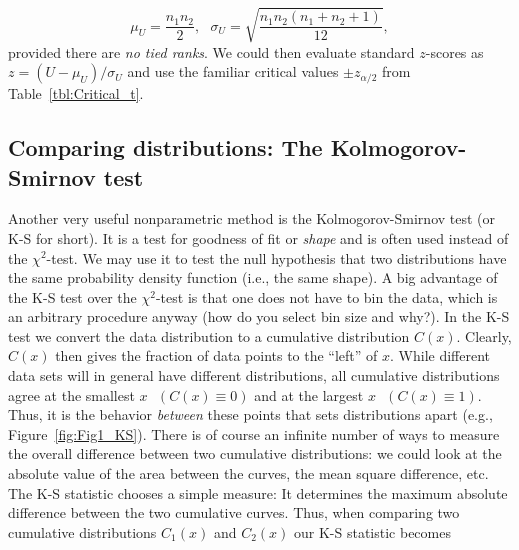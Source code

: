 \begin{equation}
\mu_U = \frac{n_1 n_2}{2}, \ \ \  \sigma _U = \sqrt{\frac{n_1 n_2(n_1 + n_2 + 1)}{12}     },
\label{eq:U_approx}
\end{equation}
provided there are \emph{no tied ranks}.  We could then evaluate standard $z$-scores as $z = (U - \mu_U)/\sigma_U$
and use the familiar critical values $\pm z_{\alpha/2}$ from Table~\ref{tbl:Critical_t}.

\subsection{Comparing distributions: The Kolmogorov-Smirnov test}


	Another very useful nonparametric method is the Kolmogorov-Smirnov test  (or K-S for short).  It is a 
test for goodness of fit or \emph{shape} and is often used instead of the $\chi^2 $-test.
We may use it to test the null hypothesis that two distributions have the same probability density function
(i.e., the same shape).  A big advantage of the 
K-S test over the $\chi^2$-test is that one does not have to bin the data, which is an arbitrary procedure 
anyway (how do you select bin size and why?).  In the K-S test we convert the data distribution 
to a cumulative distribution $C(x)$.  Clearly, $C(x)$ then gives the fraction of data points to the ``left'' of $x$.  
While different data sets will in general have different distributions, all cumulative distributions 
agree at the smallest $x \mbox{ } (C(x) \equiv 0)$ and at the largest $x \mbox{ } (C(x) \equiv 1)$.
Thus, it is the behavior \emph{between} 
these points that sets distributions apart (e.g., Figure~\ref{fig:Fig1_KS}).  There is of course an infinite number of ways to 
measure the overall difference between two cumulative distributions: we could look at the absolute 
value of the area between the curves, the mean square difference, etc.  The K-S statistic chooses 
a simple measure: It determines the maximum absolute difference between the two cumulative 
curves.  Thus, when comparing two cumulative distributions $C_1(x)$ and $C_2(x)$ our K-S statistic becomes

